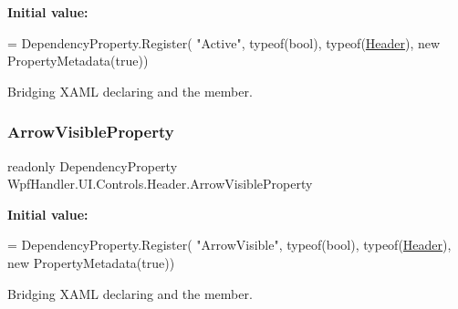 {\bfseries Initial value\+:}
\begin{DoxyCode}
= DependencyProperty.Register(
            \textcolor{stringliteral}{"Active"}, typeof(\textcolor{keywordtype}{bool}), typeof(\mbox{\hyperlink{class_wpf_handler_1_1_u_i_1_1_controls_1_1_header_a58551b76c66c4da201070cf01d0561f6}{Header}}), \textcolor{keyword}{new} PropertyMetadata(\textcolor{keyword}{true}))
\end{DoxyCode}


Bridging X\+A\+ML declaring and the member. 

\mbox{\label{class_wpf_handler_1_1_u_i_1_1_controls_1_1_header_aa3473a8ebaf39118c2ec51ddc0fcfce7}} 
\subsubsection{\texorpdfstring{Arrow\+Visible\+Property}{ArrowVisibleProperty}}
{\footnotesize\ttfamily readonly Dependency\+Property Wpf\+Handler.\+U\+I.\+Controls.\+Header.\+Arrow\+Visible\+Property\hspace{0.3cm}{\ttfamily [static]}}

{\bfseries Initial value\+:}
\begin{DoxyCode}
= DependencyProperty.Register(
            \textcolor{stringliteral}{"ArrowVisible"}, typeof(\textcolor{keywordtype}{bool}), typeof(\mbox{\hyperlink{class_wpf_handler_1_1_u_i_1_1_controls_1_1_header_a58551b76c66c4da201070cf01d0561f6}{Header}}), \textcolor{keyword}{new} PropertyMetadata(\textcolor{keyword}{true}))
\end{DoxyCode}


Bridging X\+A\+ML declaring and the member. 

\mbox{\label{class_wpf_handler_1_1_u_i_1_1_controls_1_1_header_afc03b2a1c85957c525b20e793ce9cfe4}} 
